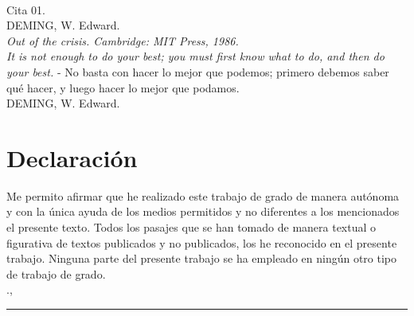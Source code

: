 {%
\newpage
\thispagestyle{empty}
\begin{flushright}
    \begin{minipage}{12.5cm}
        \noindent
        \\[10em]
        {\Large Cita 01.}
        \\[3em]
         DEMING, W. Edward.
        \\ \textit{Out of the crisis. Cambridge: MIT Press, 1986.}
        \\[10em]
        {\Large \textit{It is not enough to do your best; you must first know what to do, and then do your best.} - No basta con hacer lo mejor que podemos; primero debemos saber qué hacer, y luego hacer lo mejor que podamos.}
        \\[3em]
        DEMING, W. Edward.
    \end{minipage}
\end{flushright} 

\newpage
\chapter*{\sffamily Declaración}
\par Me permito afirmar que he realizado este trabajo de grado de manera autónoma y con la única ayuda de los medios permitidos y no diferentes a los mencionados el presente texto. Todos los pasajes que se han tomado de manera textual o figurativa de textos publicados y no publicados, los he reconocido en el presente trabajo. Ninguna parte del presente trabajo se ha empleado en ningún otro tipo de trabajo de grado. 
\\[1em]
\sede., \submissiondate
\\[6em]
\rule{6cm}{0.5pt}\\
\studentname
}